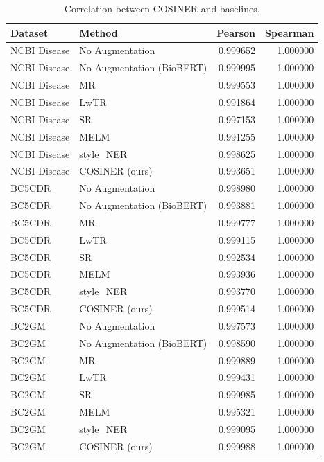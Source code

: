 \documentclass{article}
\begin{document}
\begin{table}
        \footnotesize
        \centering
        \caption{Correlation between COSINER and baselines.}\begin{tabular}{llrr}
\toprule
Dataset & Method & Pearson & Spearman \\
\midrule
NCBI Disease & No Augmentation & 0.999652 & 1.000000 \\
NCBI Disease & No Augmentation (BioBERT) & 0.999995 & 1.000000 \\
NCBI Disease & MR & 0.999553 & 1.000000 \\
NCBI Disease & LwTR & 0.991864 & 1.000000 \\
NCBI Disease & SR & 0.997153 & 1.000000 \\
NCBI Disease & MELM & 0.991255 & 1.000000 \\
NCBI Disease & style\_NER & 0.998625 & 1.000000 \\
NCBI Disease & COSINER (ours) & 0.993651 & 1.000000 \\
BC5CDR & No Augmentation & 0.998980 & 1.000000 \\
BC5CDR & No Augmentation (BioBERT) & 0.993881 & 1.000000 \\
BC5CDR & MR & 0.999777 & 1.000000 \\
BC5CDR & LwTR & 0.999115 & 1.000000 \\
BC5CDR & SR & 0.992534 & 1.000000 \\
BC5CDR & MELM & 0.993936 & 1.000000 \\
BC5CDR & style\_NER & 0.993770 & 1.000000 \\
BC5CDR & COSINER (ours) & 0.999514 & 1.000000 \\
BC2GM & No Augmentation & 0.997573 & 1.000000 \\
BC2GM & No Augmentation (BioBERT) & 0.998590 & 1.000000 \\
BC2GM & MR & 0.999889 & 1.000000 \\
BC2GM & LwTR & 0.999431 & 1.000000 \\
BC2GM & SR & 0.999985 & 1.000000 \\
BC2GM & MELM & 0.995321 & 1.000000 \\
BC2GM & style\_NER & 0.999095 & 1.000000 \\
BC2GM & COSINER (ours) & 0.999988 & 1.000000 \\
\bottomrule
\end{tabular}
\end{table}
\end{document}
